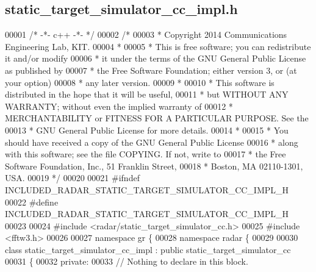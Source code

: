\subsection{static\+\_\+target\+\_\+simulator\+\_\+cc\+\_\+impl.\+h}
\label{static__target__simulator__cc__impl_8h_source}

\begin{DoxyCode}
00001 \textcolor{comment}{/* -*- c++ -*- */}
00002 \textcolor{comment}{/*}
00003 \textcolor{comment}{ * Copyright 2014 Communications Engineering Lab, KIT.}
00004 \textcolor{comment}{ *}
00005 \textcolor{comment}{ * This is free software; you can redistribute it and/or modify}
00006 \textcolor{comment}{ * it under the terms of the GNU General Public License as published by}
00007 \textcolor{comment}{ * the Free Software Foundation; either version 3, or (at your option)}
00008 \textcolor{comment}{ * any later version.}
00009 \textcolor{comment}{ *}
00010 \textcolor{comment}{ * This software is distributed in the hope that it will be useful,}
00011 \textcolor{comment}{ * but WITHOUT ANY WARRANTY; without even the implied warranty of}
00012 \textcolor{comment}{ * MERCHANTABILITY or FITNESS FOR A PARTICULAR PURPOSE.  See the}
00013 \textcolor{comment}{ * GNU General Public License for more details.}
00014 \textcolor{comment}{ *}
00015 \textcolor{comment}{ * You should have received a copy of the GNU General Public License}
00016 \textcolor{comment}{ * along with this software; see the file COPYING.  If not, write to}
00017 \textcolor{comment}{ * the Free Software Foundation, Inc., 51 Franklin Street,}
00018 \textcolor{comment}{ * Boston, MA 02110-1301, USA.}
00019 \textcolor{comment}{ */}
00020 
00021 \textcolor{preprocessor}{#ifndef INCLUDED\_RADAR\_STATIC\_TARGET\_SIMULATOR\_CC\_IMPL\_H}
00022 \textcolor{preprocessor}{#define INCLUDED\_RADAR\_STATIC\_TARGET\_SIMULATOR\_CC\_IMPL\_H}
00023 
00024 \textcolor{preprocessor}{#include <radar/static_target_simulator_cc.h>}
00025 \textcolor{preprocessor}{#include <fftw3.h>}
00026 
00027 \textcolor{keyword}{namespace }gr \{
00028   \textcolor{keyword}{namespace }radar \{
00029 
00030     \textcolor{keyword}{class }static_target_simulator_cc_impl : \textcolor{keyword}{public} static_target_simulator_cc
00031     \{
00032      \textcolor{keyword}{private}:
00033       \textcolor{comment}{// Nothing to declare in this block.}

\end{DoxyCode}
